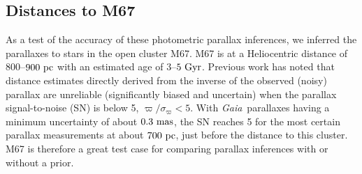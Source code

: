\documentclass[modern]{aastex61}
\newcommand{\project}[1]{\textsl{#1}}
\newcommand{\gaia}{\project{Gaia}}
\begin{document}
\subsection{Distances to M67}
As a test of the accuracy of these photometric parallax inferences, we inferred the parallaxes to stars in the open cluster M67.
M67 is at a Heliocentric distance of $800$--$900~{\rm pc}$ with an estimated age of $3$--$5~{\rm Gyr}$.
Previous work \citep{cbj15} has noted that distance estimates directly derived from the inverse of the observed (noisy) parallax are unreliable (significantly biased and uncertain) when the parallax signal-to-noise (SN) is below 5, $\varpi / \sigma_\varpi < 5$.
With \gaia\ parallaxes having a minimum uncertainty of about $0.3~{\rm mas}$, the SN reaches 5 for the most certain parallax measurements at about $700~{\rm pc}$, just before the distance to this cluster.
M67 is therefore a great test case for comparing parallax inferences with or without a prior.
\end{document}
